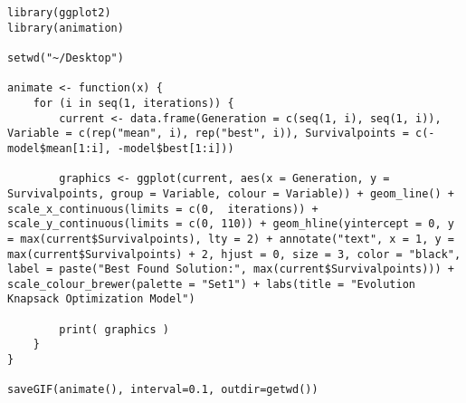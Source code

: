 \begin{lstlisting}[caption=Анимирана визуализация на процеса по търсене на оптимално решение, label=listing0177]
library(ggplot2)
library(animation)

setwd("~/Desktop")

animate <- function(x) {
	for (i in seq(1, iterations)) {
		current <- data.frame(Generation = c(seq(1, i), seq(1, i)), Variable = c(rep("mean", i), rep("best", i)), Survivalpoints = c(-model$mean[1:i], -model$best[1:i]))

		graphics <- ggplot(current, aes(x = Generation, y = Survivalpoints, group = Variable, colour = Variable)) + geom_line() + scale_x_continuous(limits = c(0,  iterations)) + scale_y_continuous(limits = c(0, 110)) + geom_hline(yintercept = 0, y = max(current$Survivalpoints), lty = 2) + annotate("text", x = 1, y = max(current$Survivalpoints) + 2, hjust = 0, size = 3, color = "black", label = paste("Best Found Solution:", max(current$Survivalpoints))) + scale_colour_brewer(palette = "Set1") + labs(title = "Evolution Knapsack Optimization Model")

		print( graphics )
    }
}

saveGIF(animate(), interval=0.1, outdir=getwd())
\end{lstlisting}

